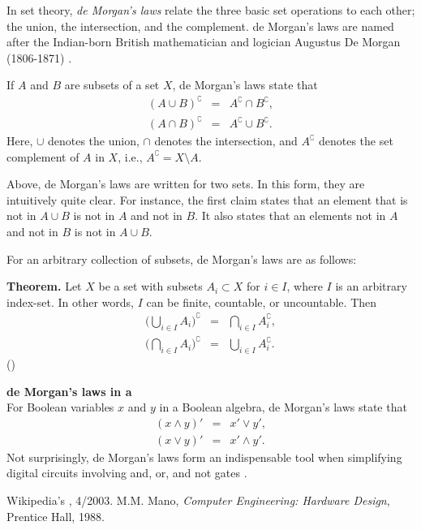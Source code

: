 \documentclass[12pt]{article}
\begin{document}
In set theory, \emph{de Morgan's laws}
relate the three basic set operations to each other; 
the union, the intersection, and the complement. 
de Morgan's laws are named after the 
Indian-born British mathematician and logician
Augustus De Morgan (1806-1871) \cite{wikidemorgan}.


If $A$ and $B$  are subsets of a set $X$, de Morgan's laws state that 
\begin{eqnarray*}
(A \cup B)^\complement &=& A^\complement \cap B^\complement, \\ 
(A \cap B)^\complement &=& A^\complement \cup B^\complement.
\end{eqnarray*}
Here, $\cup$ denotes the union, $\cap$ denotes the intersection, 
and $A^\complement$ denotes the set complement of $A$ in $X$, i.e., 
$A^\complement= X\setminus A$.

Above, de Morgan's laws are written for two sets. 
In this form, they are intuitively quite clear. 
For instance, the first claim states  that an element
that is not in $A\cup B$ is not in $A$
and not in $B$. It also states that an elements not in $A$
and not in $B$ is not in  $A\cup B$. 

For an arbitrary collection of subsets, de Morgan's laws are
as follows:

{\bf Theorem.}
 Let $X$ be a set with subsets $A_i \subset X$ for $i\in I$, where
 $I$ is an arbitrary index-set. In other words, $I$ can be finite,
 countable, or uncountable. Then
 \begin{eqnarray*}
 \Big( \bigcup_{i\in I} A_i \Big)^\complement &=& \bigcap_{i\in I} A_i^\complement, \\
 \Big( \bigcap_{i\in I} A_i \Big)^\complement &=& \bigcup_{i\in I} A_i^\complement.
 \end{eqnarray*}
()

{\bf de Morgan's laws in a  }\\
For Boolean variables $x$ and $y$ in a Boolean algebra, 
de Morgan's laws state that
\begin{eqnarray*}
(x \land y)' &=& x' \lor y', \\
(x \lor y)' &=& x' \land y'.
\end{eqnarray*}
Not surprisingly, de Morgan's laws form an indispensable tool
when simplifying digital circuits involving and, or, and not
gates \cite{mano}. 

\begin{thebibliography}{9}
Wikipedia's , 4/2003.
M.M. Mano, 
\emph{Computer Engineering: Hardware Design},
Prentice Hall, 1988.
\end{thebibliography}
\end{document}
